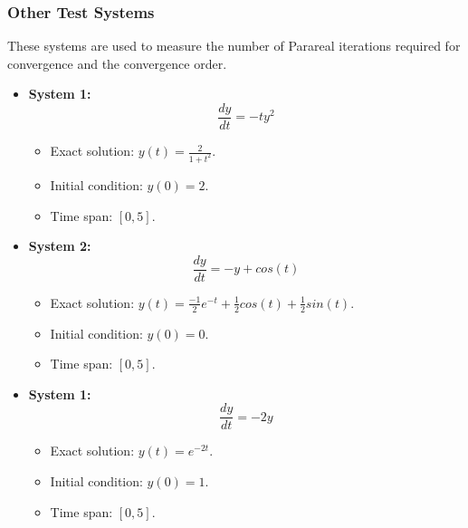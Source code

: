 \documentclass[a4paper,12pt,french]{article}
\begin{document}
\subsubsection{Other Test Systems}
These systems are used to measure the number of Parareal iterations required for convergence and the convergence order.

\begin{itemize}
    \item \textbf{System 1:} \newline \begin{equation}
            \frac{dy}{dt} = -ty^2
            \end{equation}
            \begin{itemize}
                \item Exact solution: $y(t)=\frac{2}{1+t^2}$.
                \item Initial condition: $y(0)=2$.
                \item Time span: $[0,5]$.
            \end{itemize}
    \item \textbf{System 2:} \newline \begin{equation}
            \frac{dy}{dt} = -y+ cos(t)
            \end{equation}
            \begin{itemize}
                \item Exact solution: $y(t)=\frac{-1}{2}e^{-t}+\frac{1}{2}cos(t)+\frac{1}{2}sin(t)$.
                \item Initial condition: $y(0)=0$.
                \item Time span: $[0,5]$.
            \end{itemize}
    \item \textbf{System 1:} \newline \begin{equation}
            \frac{dy}{dt} = -2y
            \end{equation}
            \begin{itemize}
                \item Exact solution: $y(t)=e^{-2t}$.
                \item Initial condition: $y(0)=1$.
                \item Time span: $[0,5]$.
            \end{itemize}
\end{itemize}

\end{document}
